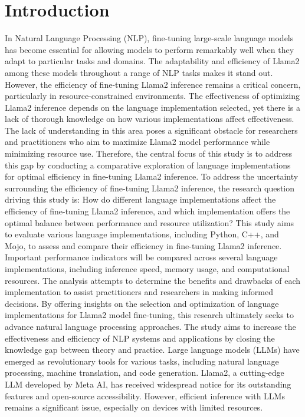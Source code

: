 \documentclass[sigconf]{acmart}
\begin{document}
\section{Introduction}
In Natural Language Processing (NLP), fine-tuning large-scale language models has become essential for allowing models to perform remarkably well when they adapt to particular tasks and domains. The adaptability and efficiency of Llama2 among these models throughout a range of NLP tasks makes it stand out. However, the efficiency of fine-tuning Llama2 inference remains a critical concern, particularly in resource-constrained environments. The effectiveness of optimizing Llama2 inference depends on the language implementation selected, yet there is a lack of thorough knowledge on how various implementations affect effectiveness. The lack of understanding in this area poses a significant obstacle for researchers and practitioners who aim to maximize Llama2 model performance while minimizing resource use. Therefore, the central focus of this study is to address this gap by conducting a comparative exploration of language implementations for optimal efficiency in fine-tuning Llama2 inference.
To address the uncertainty surrounding the efficiency of fine-tuning Llama2 inference, the research question driving this study is: How do different language implementations affect the efficiency of fine-tuning Llama2 inference, and which implementation offers the optimal balance between performance and resource utilization? This study aims to evaluate various language implementations, including Python, C++, and Mojo, to assess and compare their efficiency in fine-tuning Llama2 inference. Important performance indicators will be compared across several language implementations, including inference speed, memory usage, and computational resources. The analysis attempts to determine the benefits and drawbacks of each implementation to assist practitioners and researchers in making informed decisions.
By offering insights on the selection and optimization of language implementations for Llama2 model fine-tuning, this research ultimately seeks to advance natural language processing approaches. The study aims to increase the effectiveness and efficiency of NLP systems and applications by closing the knowledge gap between theory and practice.
Large language models (LLMs) have emerged as revolutionary tools for various tasks, including natural language processing, machine translation, and code generation. Llama2, a cutting-edge LLM developed by Meta AI, has received widespread notice for its outstanding features and open-source accessibility. However, efficient inference with LLMs remains a significant issue, especially on devices with limited resources.
\end{document}
